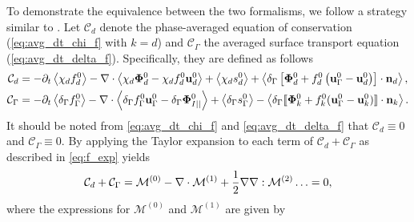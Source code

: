 To demonstrate the equivalence between the two formalisms, we follow a strategy similar to \citep{lhuillier2000bilan,lhuillier2009rheology}. 
Let $\mathcal{C}_d$ denote the phase-averaged equation of conservation (\ref{eq:avg_dt_chi_f} with $k=d$) and $\mathcal{C}_\Gamma $ the averaged surface transport equation (\ref{eq:avg_dt_delta_f}).
Specifically, they are defined as follows
\begin{align}
    \mathcal{C}_d
    &=
    - \partial_t \left<\chi_df_d^0\right>
    - \mathbf{\nabla}\cdot \left<\chi_d \mathbf{\Phi}_d^0 - \chi_df_d^0 \textbf{u}_d^0\right>
    + \left<\chi_d s_d^0\right>
    + \left<\delta_\Gamma \left[
        \mathbf{\Phi}_d^0
        + f_d^0
        \left(
            \textbf{u}_\Gamma ^0
            - \textbf{u}_d^0
        \right)
    \right]
    \cdot \textbf{n}_d\right>,\\
    \mathcal{C}_\Gamma 
    &= 
    -\partial_t \left<\delta_\Gamma f_\Gamma ^0\right>
    -\mathbf{\nabla}\cdot \left<\delta_\Gamma  f_\Gamma ^0 \textbf{u}_\Gamma ^0-\delta_\Gamma  \mathbf{\Phi}_{I||}^0 \right>
    + \left<\delta_\Gamma s_\Gamma ^0\right> 
    - \left<\delta_\Gamma  \llbracket 
     \mathbf{\Phi}_k^0+
    f_k^0 (\textbf{u}_\Gamma ^0 - \textbf{u}_k^0)
     \rrbracket \cdot \textbf{n}_k \right>. 
\end{align}
It should be noted from \ref{eq:avg_dt_chi_f} and \ref{eq:avg_dt_delta_f} that $\mathcal{C}_d\equiv 0$ and $\mathcal{C}_\Gamma  \equiv 0$.
By applying the Taylor expansion to each term of $\mathcal{C}_d+\mathcal{C}_\Gamma $ as described in \ref{eq:f_exp} yields
\begin{equation}
    \mathcal{C}_d 
    + \mathcal{C}_\Gamma  
    = \mathcal{M}^{(0)} - \mathbf{\nabla}\cdot \mathcal{M}^{(1)} + \frac{1}{2} \mathbf{\nabla}\mathbf{\nabla} : \mathcal{M}^{(2)} \ldots = 0,
    \label{eq:scheme_equivalence}
\end{equation} 
where the expressions for $\mathcal{M}^{(0)}$ and $\mathcal{M}^{(1)}$ are given by 
